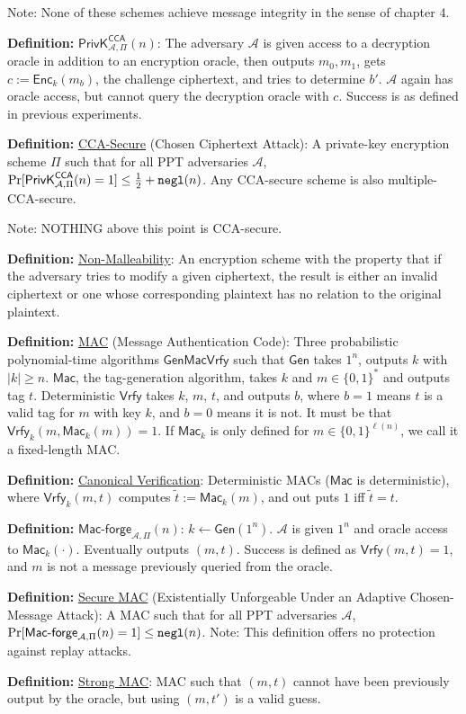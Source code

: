\documentclass[10pt]{article}
\newcommand{\AAA}{\mathcal{A}}
\newcommand{\defn}[1]{{\bf Definition:} \underline{#1}}
\newcommand{\Enc}{\mathsf{Enc}}
\newcommand{\Mac}{\mathsf{Mac}}
\newcommand{\Macf}{\mathsf{Mac\text{-}forge}}
\newcommand{\Vrfy}{\mathsf{Vrfy}}
\newcommand{\Gen}{\mathsf{Gen}}
\newcommand{\ExptCcaArgs}[2]{\mathsf{PrivK}^{\mathsf{CCA}}_{#1,#2}}
\newcommand{\ExptCca}{\ExptCcaArgs{\AAA}{\Pi}}
\newcommand{\negl}{{\tt negl}}
\newcommand{\from}{\leftarrow}
\begin{document}
\begin{multicols}{4}
Note: None of these schemes achieve message integrity in the sense of chapter 4.

\defn{$\ExptCca(n)$}: The adversary $\AAA$ is given access to a decryption oracle in addition to an encryption oracle, then outputs $m_0,m_1$, gets $c:=\Enc_k(m_b)$, the challenge ciphertext, and tries to determine $b'$. $\AAA$ again has oracle access, but cannot query the decryption oracle with $c$. Success is as defined in previous experiments.

\defn{CCA-Secure} (Chosen Ciphertext Attack): A private-key encryption scheme $\Pi$ such that for all PPT adversaries $\AAA$, $\Pr[\ExptCca(n)=1]\leq\frac{1}{2}+\negl(n)$. Any CCA-secure scheme is also multiple-CCA-secure.

Note: NOTHING above this point is CCA-secure.

\defn{Non-Malleability}: An encryption scheme with the property that if the adversary tries to modify a given ciphertext, the result is either an invalid ciphertext or one whose corresponding plaintext has no relation to the original plaintext.

\defn{MAC} (Message Authentication Code): Three probabilistic polynomial-time algorithms $\Gen\Mac\Vrfy$ such that $\Gen$ takes $1^n$, outputs $k$ with $|k|\geq n$. $\Mac$, the tag-generation algorithm, takes $k$ and $m\in\{0,1\}^*$ and outputs tag $t$. Deterministic $\Vrfy$ takes $k$, $m$, $t$, and outputs $b$, where $b=1$ means $t$ is a valid tag for $m$ with key $k$, and $b=0$ means it is not. It must be that $\Vrfy_k(m,\Mac_k(m))=1$. If $\Mac_k$ is only defined for $m\in\{0,1\}^{\ell(n)}$, we call it a fixed-length MAC.

\defn{Canonical Verification}: Deterministic MACs ($\Mac$ is deterministic), where $\Vrfy_k(m,t)$ computes $\tilde{t}:=\Mac_k(m)$, and out puts $1$ iff $\tilde{t}=t$.

\defn{$\Macf_{\AAA,\Pi}(n)$}: $k\from\Gen(1^n)$. $\AAA$ is given $1^n$ and oracle access to $\Mac_k(\cdot)$. Eventually outputs $(m,t)$. Success is defined as $\Vrfy(m,t)=1$, and $m$ is not a message previously queried from the oracle.

\defn{Secure MAC} (Existentially Unforgeable Under an Adaptive Chosen-Message Attack): A MAC such that for all PPT adversaries $\AAA$, $\Pr[\Macf_{\AAA,\Pi}(n)=1]\leq\negl(n)$. Note: This definition offers no protection against replay attacks.

\defn{Strong MAC}: MAC such that $(m,t)$ cannot have been previously output by the oracle, but using $(m,t')$ is a valid guess.


\end{multicols}
\end{document}
